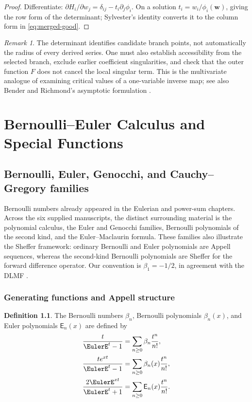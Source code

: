 \documentclass[11pt,a4paper,oneside,openany]{book}
\theoremstyle{definition}
\newtheorem{definition}[theorem]{Definition}
\theoremstyle{remark}
\newtheorem{remark}[theorem]{Remark}
\begin{document}
\begin{proof}
Differentiate:
$\partial H_i/\partial w_j=\delta_{ij}-t_i\partial_j\phi_i$.
On a solution $t_i=w_i/\phi_i(\bm w)$, giving the row form of the determinant;
Sylvester's identity converts it to the column form in
\eqref{eq:merged-good}.
\end{proof}

\begin{remark}
The determinant identifies candidate branch points, not automatically the
radius of every derived series.  One must also establish accessibility from
the selected branch, exclude earlier coefficient singularities, and check
that the outer function $F$ does not cancel the local singular term.  This is
the multivariate analogue of examining critical values of a one-variable
inverse map; see also Bender and Richmond's asymptotic formulation
\cite{BenderRichmond1998}.
\end{remark}

\part{Bernoulli--Euler Calculus and Special Functions}

\chapter{Bernoulli, Euler, Genocchi, and Cauchy--Gregory families}
\label{ch:merged-bernoulli-euler}

Bernoulli numbers already appeared in the Eulerian and power-sum chapters.
Across the six supplied manuscripts, the distinct surrounding material is the
polynomial calculus, the Euler and Genocchi families, Bernoulli polynomials of
the second kind, and the Euler--Maclaurin formula.  These families also illustrate the Sheffer
framework: ordinary Bernoulli and Euler polynomials are Appell sequences,
whereas the second-kind Bernoulli polynomials are Sheffer for the forward
difference operator.  Our convention is $\beta_1=-1/2$, in agreement with the
DLMF \cite{NISTDLMF}.

\section{Generating functions and Appell structure}

\begin{definition}
The Bernoulli numbers $\beta_n$, Bernoulli polynomials $\beta_n(x)$, and Euler
polynomials $\mathsf E_n(x)$ are defined by
\begin{align}
 \frac{t}{\EulerE^t-1}&=\sum_{n\geq0}\beta_n\frac{t^n}{n!},               \label{eq:merged-bernoulli-egf}\\
 \frac{te^{xt}}{\EulerE^t-1}&=\sum_{n\geq0}\beta_n(x)\frac{t^n}{n!},      \label{eq:merged-bernoulli-poly-egf}\\
 \frac{2\EulerE^{xt}}{\EulerE^t+1}&=\sum_{n\geq0}\mathsf E_n(x)\frac{t^n}{n!}.\label{eq:merged-euler-poly-egf}
\end{align}
\end{definition}
\end{document}
